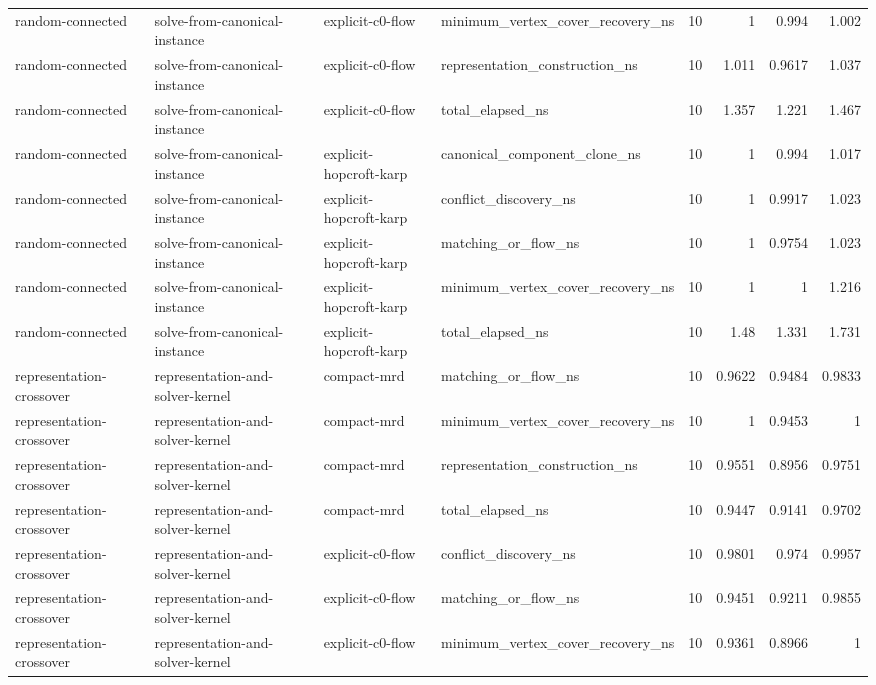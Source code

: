 \begin{table}[t]
\begin{tabular}{llllrrrr}
random-connected & solve-from-canonical-instance & explicit-c0-flow & minimum\_vertex\_cover\_recovery\_ns & 10 & 1 & 0.994 & 1.002 \\
random-connected & solve-from-canonical-instance & explicit-c0-flow & representation\_construction\_ns & 10 & 1.011 & 0.9617 & 1.037 \\
random-connected & solve-from-canonical-instance & explicit-c0-flow & total\_elapsed\_ns & 10 & 1.357 & 1.221 & 1.467 \\
random-connected & solve-from-canonical-instance & explicit-hopcroft-karp & canonical\_component\_clone\_ns & 10 & 1 & 0.994 & 1.017 \\
random-connected & solve-from-canonical-instance & explicit-hopcroft-karp & conflict\_discovery\_ns & 10 & 1 & 0.9917 & 1.023 \\
random-connected & solve-from-canonical-instance & explicit-hopcroft-karp & matching\_or\_flow\_ns & 10 & 1 & 0.9754 & 1.023 \\
random-connected & solve-from-canonical-instance & explicit-hopcroft-karp & minimum\_vertex\_cover\_recovery\_ns & 10 & 1 & 1 & 1.216 \\
random-connected & solve-from-canonical-instance & explicit-hopcroft-karp & total\_elapsed\_ns & 10 & 1.48 & 1.331 & 1.731 \\
representation-crossover & representation-and-solver-kernel & compact-mrd & matching\_or\_flow\_ns & 10 & 0.9622 & 0.9484 & 0.9833 \\
representation-crossover & representation-and-solver-kernel & compact-mrd & minimum\_vertex\_cover\_recovery\_ns & 10 & 1 & 0.9453 & 1 \\
representation-crossover & representation-and-solver-kernel & compact-mrd & representation\_construction\_ns & 10 & 0.9551 & 0.8956 & 0.9751 \\
representation-crossover & representation-and-solver-kernel & compact-mrd & total\_elapsed\_ns & 10 & 0.9447 & 0.9141 & 0.9702 \\
representation-crossover & representation-and-solver-kernel & explicit-c0-flow & conflict\_discovery\_ns & 10 & 0.9801 & 0.974 & 0.9957 \\
representation-crossover & representation-and-solver-kernel & explicit-c0-flow & matching\_or\_flow\_ns & 10 & 0.9451 & 0.9211 & 0.9855 \\
representation-crossover & representation-and-solver-kernel & explicit-c0-flow & minimum\_vertex\_cover\_recovery\_ns & 10 & 0.9361 & 0.8966 & 1 \\

\end{tabular}
\end{table}
